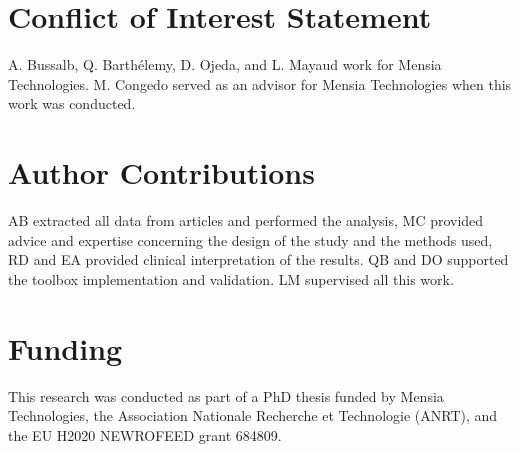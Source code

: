 
\section*{Conflict of Interest Statement}
A. Bussalb, Q. Barth\'elemy, D. Ojeda, and L. Mayaud work for Mensia Technologies.
M. Congedo served as an advisor for Mensia Technologies when this work was conducted.  

\section*{Author Contributions}
AB extracted all data from articles and performed the analysis, MC provided advice and expertise
concerning the design of the study and the methods used, RD and EA 
provided clinical interpretation of the results. QB and DO supported the toolbox implementation
and validation. LM supervised all this work. 

\section*{Funding}
This research was conducted as part of a PhD thesis funded by Mensia Technologies, the 
Association Nationale Recherche et Technologie (ANRT), and the EU H2020 NEWROFEED grant 684809.

